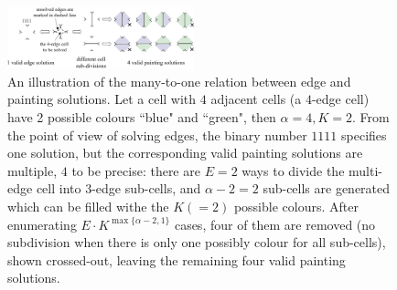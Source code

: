 \documentclass[conference]{IEEEtran}
\begin{document}
\begin{figure}[t]
\centering
\includegraphics[width = 0.48\textwidth]{figures/many_to_one_3}
\caption{An illustration of the many-to-one relation between edge and painting solutions. 
Let a cell with $4$ adjacent cells (a $4$-edge cell) have 2 possible colours ``blue" and ``green", then $\alpha = 4, K = 2$. From the point of view of solving edges, the binary number $1111$ specifies one solution, but the corresponding valid painting solutions are multiple, $4$ to be precise: there are $E=2$ ways to divide the multi-edge cell into $3$-edge sub-cells, and $\alpha-2 = 2$ sub-cells are generated which can be filled withe the $K (=2)$ possible colours. After enumerating $E\cdot K^{\max\{\alpha-2, 1\}}$ cases, four of them are removed (no subdivision when there is only one possibly colour for all sub-cells), shown crossed-out, leaving the remaining four valid painting solutions.
}
\label{fig:many_to_one}
\end{figure}
\end{document}
